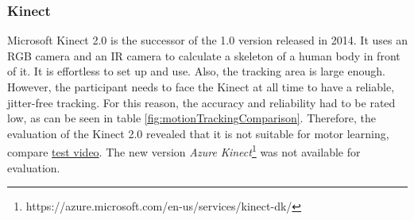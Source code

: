 \subsubsection{Kinect}
Microsoft Kinect 2.0 is the successor of the 1.0 version released in 2014. It uses an RGB camera and an IR camera to calculate a skeleton of a human body in front of it. It is effortless to set up and use. Also, the tracking area is large enough. However, the participant needs to face the Kinect at all time to have a reliable, jitter-free tracking. For this reason, the accuracy and reliability had to be rated low, as can be seen in table \ref{fig:motionTrackingComparison}. Therefore, the evaluation of the Kinect 2.0 revealed that it is not suitable for motor learning, compare \href{https://youtu.be/3ftKXTBCN0Y}{test video}. The new version \textit{Azure Kinect}\footnote{https://azure.microsoft.com/en-us/services/kinect-dk/} was not available for evaluation. 


